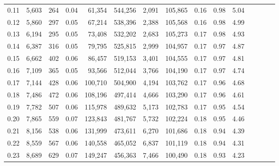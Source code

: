 \begin{tabular}{rrrcrrrrrrrrrrr}
0.11 &   5,603 &    264 &                                       0.04 &   61,354 &  544,256 &    2,091 &  105,865 &  0.16 &  0.98 &                         5.04 \\
0.12 &   5,860 &    297 &                                       0.05 &   67,214 &  538,396 &    2,388 &  105,568 &  0.16 &  0.98 &                         4.99 \\
0.13 &   6,194 &    295 &                                       0.05 &   73,408 &  532,202 &    2,683 &  105,273 &  0.17 &  0.98 &                         4.93 \\
0.14 &   6,387 &    316 &                                       0.05 &   79,795 &  525,815 &    2,999 &  104,957 &  0.17 &  0.97 &                         4.87 \\
0.15 &   6,662 &    402 &                                       0.06 &   86,457 &  519,153 &    3,401 &  104,555 &  0.17 &  0.97 &                         4.81 \\
0.16 &   7,109 &    365 &                                       0.05 &   93,566 &  512,044 &    3,766 &  104,190 &  0.17 &  0.97 &                         4.74 \\
0.17 &   7,144 &    428 &                                       0.06 &  100,710 &  504,900 &    4,194 &  103,762 &  0.17 &  0.96 &                         4.68 \\
0.18 &   7,486 &    472 &                                       0.06 &  108,196 &  497,414 &    4,666 &  103,290 &  0.17 &  0.96 &                         4.61 \\
0.19 &   7,782 &    507 &                                       0.06 &  115,978 &  489,632 &    5,173 &  102,783 &  0.17 &  0.95 &                         4.54 \\
0.20 &   7,865 &    559 &                                       0.07 &  123,843 &  481,767 &    5,732 &  102,224 &  0.18 &  0.95 &                         4.46 \\
0.21 &   8,156 &    538 &                                       0.06 &  131,999 &  473,611 &    6,270 &  101,686 &  0.18 &  0.94 &                         4.39 \\
0.22 &   8,559 &    567 &                                       0.06 &  140,558 &  465,052 &    6,837 &  101,119 &  0.18 &  0.94 &                         4.31 \\
0.23 &   8,689 &    629 &                                       0.07 &  149,247 &  456,363 &    7,466 &  100,490 &  0.18 &  0.93 &                         4.23 \\

\end{tabular}
